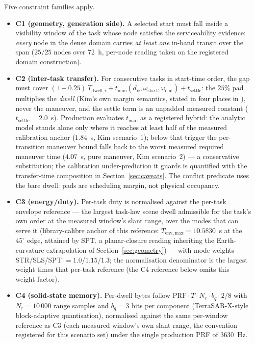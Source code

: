 \documentclass[preprint,authoryear]{elsarticle}
\begin{document}
Five constraint families apply.
\begin{itemize}
\item \textbf{C1 (geometry, generation side).} A selected start must fall inside a visibility window of the task whose node satisfies the serviceability evidence: \emph{every} node in the dense domain carries \emph{at least one} in-band transit over the span ($25/25$ nodes over 72~h, per-node reading taken on the registered domain construction).
\item \textbf{C2 (inter-task transfer).} For consecutive tasks in start-time order, the gap must cover $(1+0.25)\,T_{\mathrm{dwell},i}+t_{\mathrm{man}}(d_\psi,\omega_{\mathrm{start}},\omega_{\mathrm{end}})+t_{\mathrm{settle}}$: the $25\%$ pad multiplies the \emph{dwell} (Kim's own margin semantics, stated in four places in \citealt{kim2021optimal}), never the maneuver, and the settle term is an unpadded measured constant ($t_{\mathrm{settle}}=2.0$~s). Production evaluates $t_{\mathrm{man}}$ as a registered hybrid: the analytic model stands alone only where it reaches at least half of the measured calibration anchor ($1.84$~s, Kim scenario~1); below that trigger the per-transition maneuver bound falls back to the worst measured required maneuver time ($4.07$~s, pure maneuver, Kim scenario~2) --- a conservative substitution; the calibration under-prediction it guards is quantified with the transfer-time composition in Section~\ref{sec:caveats}. The conflict predicate uses the bare dwell: pads are scheduling margin, not physical occupancy.
\item \textbf{C3 (energy/duty).} Per-task duty is normalised against the per-task envelope reference --- the largest task-law scene dwell admissible for the task's own order at the measured window's slant range, over the modes that can serve it (library-calibre anchor of this reference: $T_{\mathrm{env,max}}=10.5830$~s at the $45^{\circ}$ edge, attained by SPT, a planar-closure reading inheriting the Earth-curvature extrapolation of Section~\ref{sec:geometry}) --- with mode weights STR/SLS/SPT $=1.0/1.15/1.3$; the normalisation denominator is the largest weight times that per-task reference (the C4 reference below omits this weight factor).
\item \textbf{C4 (solid-state memory).} Per-dwell bytes follow $\mathrm{PRF}\cdot T\cdot N_r\cdot b_q\cdot 2/8$ with $N_r=10\,000$ range samples and $b_q=3$ bits per component (TerraSAR-X-style block-adaptive quantisation), normalised against the same per-window reference as C3 (each measured window's own slant range, the convention registered for this scenario set) under the single production PRF of $3630$~Hz.

\end{itemize}
\end{document}
